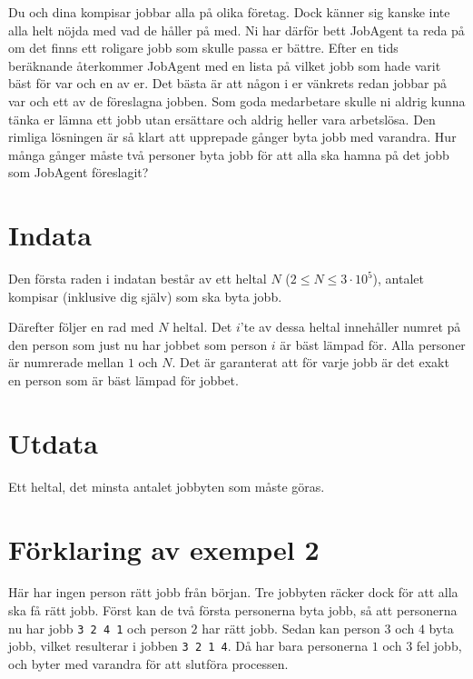Du och dina kompisar jobbar alla på olika företag. 
Dock känner sig kanske inte alla helt nöjda med vad de håller på med. 
Ni har därför bett JobAgent ta reda på om det finns ett roligare jobb som skulle passa er bättre.
Efter en tids beräknande återkommer JobAgent med en lista på vilket jobb som hade varit bäst för var och en av er. Det bästa är att någon i er vänkrets redan jobbar på var och ett av de föreslagna jobben. 
Som goda medarbetare skulle ni aldrig kunna tänka er lämna ett jobb utan ersättare och aldrig heller vara arbetslösa.
Den rimliga lösningen är så klart att upprepade gånger byta jobb med varandra.
Hur många gånger måste två personer byta jobb för att alla ska hamna på det jobb som JobAgent föreslagit?

\section*{Indata}
Den första raden i indatan består av ett heltal $N$ ($2 \le N \le 3\cdot10^5$), antalet kompisar (inklusive dig själv) som ska byta jobb.

Därefter följer en rad med $N$ heltal.
Det $i$'te av dessa heltal innehåller numret på den person som just nu har jobbet som person $i$ är bäst lämpad för.
Alla personer är numrerade mellan $1$ och $N$.
Det är garanterat att för varje jobb är det exakt en person som är bäst lämpad för jobbet.

\section*{Utdata}
Ett heltal, det minsta antalet jobbyten som måste göras. 

\section*{Förklaring av exempel 2}
Här har ingen person rätt jobb från början.
Tre jobbyten räcker dock för att alla ska få rätt jobb.
Först kan de två första personerna byta jobb, så att personerna nu har jobb \texttt{3 2 4 1} och person $2$ har rätt jobb.
Sedan kan person $3$ och $4$ byta jobb, vilket resulterar i jobben \texttt{3 2 1 4}.
Då har bara personerna $1$ och $3$ fel jobb, och byter med varandra för att slutföra processen.

